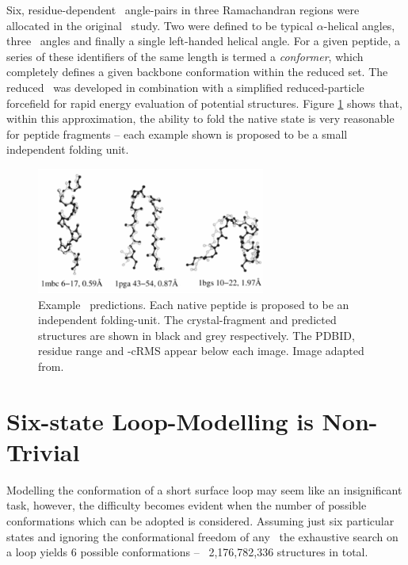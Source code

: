 Six, residue-dependent \phipsi\ angle-pairs in three Ramachandran regions were allocated in the original \raft\ study. Two were defined to be typical $\alpha$-helical angles, three \bstrand\ angles and finally a single left-handed helical angle. 
For a given peptide, a series of these identifiers of the same length is termed a \emph{conformer}, which completely defines a given backbone conformation within the reduced set. The reduced \angleset\ was developed in combination with a simplified reduced-particle  forcefield for rapid energy evaluation of potential structures. 
Figure \ref{fig:reducedrep:raft_conformers} shows that, within this approximation, the ability to fold the native state is very reasonable for peptide fragments -- each example shown is proposed to be a small independent folding unit\cite{COMPCHEM:Ped1997}. 



\begin{figure}[hbtp]
\begin{center}
\includegraphics[width=0.67\textwidth]{05-ReducedRep/complexity/conformer.png}
\end{center}
\caption[Example \raft\ conformers]{Example \raft\ predictions. Each native peptide is proposed to be an independent folding-unit\cite{COMPCHEM:Ped1997}. The crystal-fragment and predicted structures are shown in black and grey respectively. The PDBID, residue range and \ca-cRMS appear below each image. Image adapted from\cite{COMPCHEM:Gib2001}.}
\label{fig:reducedrep:raft_conformers}
\end{figure}



\section{Six-state Loop-Modelling is Non-Trivial}

Modelling the conformation of a short surface loop may seem like an insignificant task, however, the difficulty becomes evident when the number of possible conformations which can be adopted is considered.  Assuming just six particular states and ignoring the conformational freedom of any \sidechains\, the exhaustive search on a  loop yields 6 possible conformations -- \ie\ 2,176,782,336 structures in total. 

